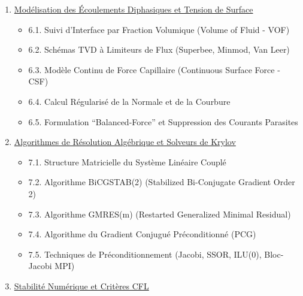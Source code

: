 \documentclass[
  french,
]{article}
\providecommand{\tightlist}{%
  \setlength{\itemsep}{0pt}\setlength{\parskip}{0pt}}
\begin{document}
\begin{enumerate}
  \begin{itemize}
  \tightlist
  \item
    5.1. Formulation Conservative Implicite
  \item
    5.2. Conditions aux Limites Thermiques (Dirichlet et Neumann
    Adiabatique)
  \item
    5.3. Définition et Calcul du Nombre de Nusselt Local et Moyen
  \end{itemize}
\item
  \hyperref[6-moduxe9lisation-des-uxe9coulements-diphasiques-et-tension-de-surface]{Modélisation
  des Écoulements Diphasiques et Tension de Surface}

  \begin{itemize}
  \tightlist
  \item
    6.1. Suivi d'Interface par Fraction Volumique (Volume of Fluid -
    VOF)
  \item
    6.2. Schémas TVD à Limiteurs de Flux (Superbee, Minmod, Van Leer)
  \item
    6.3. Modèle Continu de Force Capillaire (Continuous Surface Force -
    CSF)
  \item
    6.4. Calcul Régularisé de la Normale et de la Courbure
  \item
    6.5. Formulation ``Balanced-Force'' et Suppression des Courants
    Parasites
  \end{itemize}
\item
  \hyperref[7-algorithmes-de-ruxe9solution-alguxe9brique-et-solveurs-de-krylov]{Algorithmes
  de Résolution Algébrique et Solveurs de Krylov}

  \begin{itemize}
  \tightlist
  \item
    7.1. Structure Matricielle du Système Linéaire Couplé
  \item
    7.2. Algorithme BiCGSTAB(2) (Stabilized Bi-Conjugate Gradient Order
    2)
  \item
    7.3. Algorithme GMRES(m) (Restarted Generalized Minimal Residual)
  \item
    7.4. Algorithme du Gradient Conjugué Préconditionné (PCG)
  \item
    7.5. Techniques de Préconditionnement (Jacobi, SSOR, ILU(0),
    Bloc-Jacobi MPI)
  \end{itemize}
\item
  \hyperref[8-stabilituxe9-numuxe9rique-et-crituxe8res-cfl]{Stabilité
  Numérique et Critères CFL}


\end{enumerate}
\end{document}
